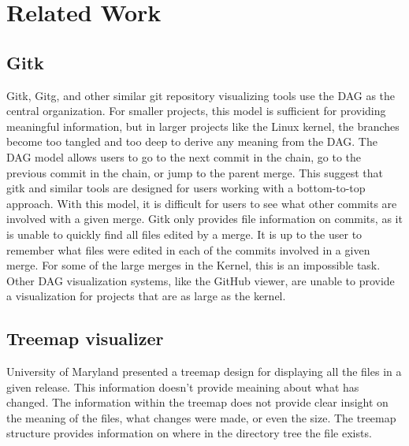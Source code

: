 \documentclass[conference, draftclsnofoot]{IEEEtran}
\begin{document}
\section{Related Work}

\subsection{Gitk}
Gitk, Gitg, and other similar git repository visualizing tools use the DAG as
the central organization. For smaller projects, this model is sufficient for
providing meaningful information, but in larger projects like the Linux kernel,
the branches become too tangled and too deep to derive any meaning from the
DAG. The DAG model allows users to go to the next commit in the chain, go to
the previous commit in the chain, or jump to the parent merge. This suggest
that gitk and similar tools are designed for users working with a bottom-to-top
approach. With this model, it is difficult for users to see what other commits
are involved with a given merge. Gitk only provides file information on
commits, as it is unable to quickly find all files edited by a merge. It is up
to the user to remember what files were edited in each of the commits involved
in a given merge. For some of the large merges in the Kernel, this is an
impossible task.  Other DAG visualization systems, like the GitHub viewer, are unable to
provide a visualization for projects that are as large as the
kernel.





\subsection{Treemap visualizer}
University of Maryland presented a treemap design for displaying all the files
in a given release. This information doesn't provide meaining about what has
changed. The information within the treemap does not provide clear insight on
the meaning of the files, what changes were made, or even the size. The treemap
structure provides information on where in the directory tree the file exists.
\end{document}
